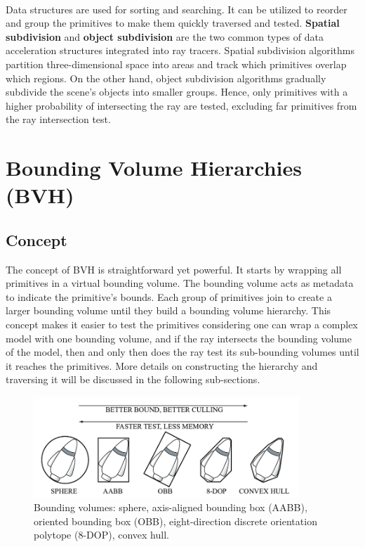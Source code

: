 \documentclass[11pt,a4paper]{article}
\begin{document}
\noindent
\\ 
Data structures are used for sorting and searching. It can be utilized to reorder and group the primitives to make them quickly traversed and tested. \textbf{Spatial subdivision} and \textbf{object subdivision} are the two common types of data acceleration structures integrated into ray tracers. Spatial subdivision algorithms partition three-dimensional space into areas and track which primitives overlap which regions. On the other hand, object subdivision algorithms gradually subdivide the scene's objects into smaller groups. Hence, only primitives with a higher probability of intersecting the ray are tested, excluding far primitives from the ray intersection test. 

\clearpage

\section{Bounding Volume Hierarchies (BVH)}
\subsection{Concept}
The concept of BVH is straightforward yet powerful. It starts by wrapping all primitives in a virtual bounding volume. The bounding volume acts as metadata to indicate the primitive's bounds. Each group of primitives join to create a larger bounding volume until they build a bounding volume hierarchy. This concept makes it easier to test the primitives considering one can wrap a complex model with one bounding volume, and if the ray intersects the bounding volume of the model, then and only then does the ray test its sub-bounding volumes until it reaches the primitives. More details on constructing the hierarchy and traversing it will be discussed in the following sub-sections.

\begin{figure}[h]	
     \centering
     \captionsetup{justification=centering,margin=2cm}
     \includegraphics[width=10cm]{images/bvs.png}
     \caption{Bounding volumes: sphere, axis-aligned bounding box (AABB), oriented bounding box (OBB), eight-direction discrete orientation polytope (8-DOP), convex hull. \protect\cite{Ericson2004}}
     \label{fig:boundingboxes}
\end{figure}
\end{document}
